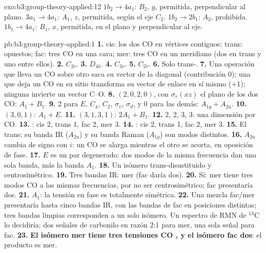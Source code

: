 \begin{solution}{exo:b3:group-theory-applied:12}
$1b_2 \to 4a_1$: $B_2$, $y$, permitida, perpendicular al plano. $3a_1 \to 4a_1$:
$A_1$, $z$, permitida, según el eje $C_2$. $1b_2 \to 2b_1$: $A_2$, prohibida.
$1b_1 \to 4a_1$: $B_1$, $x$, permitida, en el plano y perpendicular al eje.
\end{solution}

\begin{solution}{pb:b3:group-theory-applied:1}
\textbf{1.} cis: los dos CO en vértices contiguos; trans: opuestos; fac: tres
CO en una cara; mer: tres CO en un meridiano (dos en trans y uno entre ellos).
\textbf{2.} $C_{2v}$.
\textbf{3.} $D_{4h}$.
\textbf{4.} $C_{3v}$.
\textbf{5.} $C_{2v}$.
\textbf{6.} Solo trans-.
\textbf{7.} Una operación que lleva un CO sobre otro saca su vector de la
diagonal (contribución 0); una que deja un CO en su sitio transforma su vector de enlace
en sí mismo (+1); ninguna invierte un vector C--O.
\textbf{8.}  $(2, 0, 2, 0)$, con $\sigma_v(xz)$ el plano de los dos CO: $A_1 +
B_1$.
\textbf{9.}  2 para $E$, $C_4$, $C_2$, $\sigma_v$, $\sigma_d$, y 0 para las demás:
$A_{1g} + A_{2u}$.
\textbf{10.} $(3, 0, 1)$: $A_1 + E$.
\textbf{11.} $(3, 1, 3, 1)$: $2A_1 + B_1$.
\textbf{12.} 2, 2, 3, 3: una dimensión por CO.
\textbf{13.} : cis 2, trans 1, fac 2, mer 3.
\textbf{14.} : cis 2, trans 1, fac 2, mer 3.
\textbf{15.} El trans: su banda IR ($A_{2u}$) y su banda Raman ($A_{1g}$) son modos
distintos.
\textbf{16.} $A_{2u}$ cambia de signo con $i$: un CO se alarga mientras el otro
se acorta, en oposición de fase.
\textbf{17.} $E$ es un par degenerado: dos modos de la misma frecuencia dan una sola
banda, más la banda $A_1$.
\textbf{18.} Un isómero trans-disustituido y centrosimétrico.
\textbf{19.} Tres bandas IR: mer (fac daría dos).
\textbf{20.} Sí: mer tiene tres modos CO  a las mismas frecuencias,
por no ser centrosimétrico; fac presentaría dos.
\textbf{21.} $A_1$: la tensión en fase es totalmente simétrica.
\textbf{22.} Una mezcla fac/mer presentaría hasta cinco bandas IR, con las bandas
de fac en posiciones distintas; tres bandas limpias corresponden a un solo isómero. Un
espectro de RMN de ${}^{13}$C lo decidiría: dos señales de carbonilo en razón 2:1 para
mer, una sola señal para fac.
\textbf{23.} \textbf{El isómero mer tiene tres tensiones CO , y el isómero
fac dos}: el producto es mer.
\end{solution}
